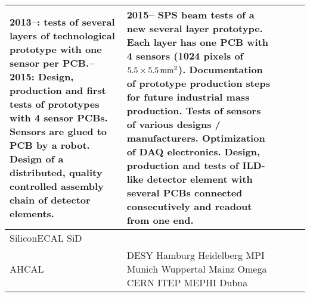 \begin{landscape}
\begin{adjustbox}{max width=1\textheight,totalheight=1\textwidth}
\begin{tabularx}{2\textheight}{lXXXX}
    2013--: tests of several layers of technological prototype with one sensor per PCB.\newline
    2014--2015: Design, production and first tests of prototypes with 4 sensor PCBs. Sensors are glued to PCB by a robot. Design of a distributed, quality controlled assembly chain of detector elements. &
    2015-- SPS beam tests of a new several layer prototype. Each layer has one PCB with 4 sensors (1024 pixels of $\unit[5.5\times 5.5]{mm^2}$).\newline
    Documentation of prototype production steps for future industrial mass production.\newline
    Tests of sensors of various designs / manufacturers.\newline
    Optimization of DAQ electronics.\newline
    Design, production and tests of ILD-like detector element with several PCBs connected consecutively and readout from one end. \\
    \midrule
    SiliconECAL SiD &
    &                                                                                                                                                                                                                                                                                                                                                                                      &                                                                                                                                                                                                                                                                 &                                                                                                                                                                                                                                     \\
    \midrule
    AHCAL &
    DESY\newline
    Hamburg\newline
    Heidelberg\newline
    MPI Munich \newline
    Wuppertal\newline
    Mainz\newline
    Omega\newline
    CERN\newline
    ITEP\newline
    MEPHI\newline
    Dubna\newline

\end{tabularx}
\end{adjustbox}
\end{landscape}
